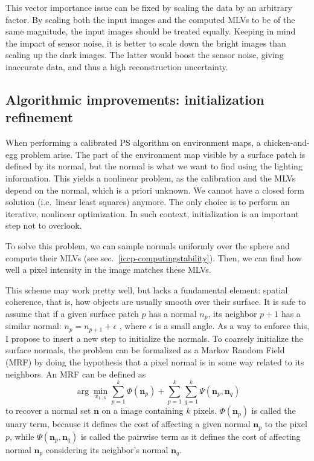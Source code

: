 This vector importance issue can be fixed by scaling the data by an arbitrary factor. By scaling both the input images and the computed MLVs to be of the same magnitude, the input images should be treated equally. Keeping in mind the impact of sensor noise, it is better to scale down the bright images than scaling up the dark images. The latter would boost the sensor noise, giving inaccurate data, and thus a high reconstruction uncertainty.




\subsection{Algorithmic improvements: initialization refinement}
\label{subsec:calibrated}

When performing a calibrated PS algorithm on environment maps, a chicken-and-egg problem arise. The part of the environment map visible by a surface patch is defined by its normal, but the normal is what we want to find using the lighting information. This yields a nonlinear problem, as the calibration and the MLVs depend on the normal, which is a priori unknown. We cannot have a closed form solution (i.e.\ linear least squares) anymore. The only choice is to perform an iterative, nonlinear optimization. In such context, initialization is an important step not to overlook.

To solve this problem, we can sample normals uniformly over the sphere and compute their MLVs (see sec.~\ref{iccp-computingstability}). Then, we can find how well a pixel intensity in the image matches these MLVs.

This scheme may work pretty well, but lacks a fundamental element: spatial coherence, that is, how objects are usually smooth over their surface. It is safe to assume that if a given surface patch $p$ has a normal $n_p$, its neighbor $p+1$ has a similar normal: $ n_p = n_{p+1} + \epsilon $ , where $\epsilon$ is a small angle. As a way to enforce this, I propose to insert a new step to initialize the normals. To coarsely initialize the surface normals, the problem can be formalized as a Markov Random Field (MRF) by doing the hypothesis that a pixel normal is in some way related to its neighbors. An MRF can be defined as
\begin{equation}
    \arg \min_{x_{1\ldots k}} \sum_{p=1}^k \Phi (\mathbf{n}_p) + \sum_{p=1}^k \sum_{q=1}^k \Psi(\mathbf{n}_p, \mathbf{n}_q)
\end{equation}
to recover a normal set $\mathbf{n}$ on a image containing $k$ pixels. $\Phi(\mathbf{n}_p)$ is called the unary term, because it defines the cost of affecting a given normal $\mathbf{n}_p$ to the pixel $p$, while $\Psi(\mathbf{n}_p, \mathbf{n}_q)$ is called the pairwise term as it defines the cost of affecting normal $\mathbf{n}_p$ considering its neighbor's normal $\mathbf{n}_q$.

